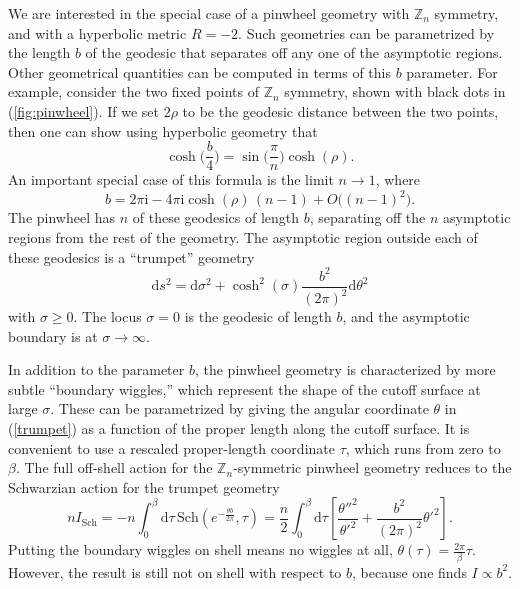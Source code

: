 \documentclass[12pt]{article}
\newcommand{\be}{\begin{equation}}
\newcommand{\ee}{\end{equation}}
\numberwithin{equation}{section}
\begin{document}

We are interested in the special case of a pinwheel geometry with $\mathbb{Z}_n$ symmetry, and with a hyperbolic metric $R = -2$. Such geometries can be parametrized by the length $b$ of the geodesic that separates off any one of the asymptotic regions. Other geometrical quantities can be computed in terms of this $b$ parameter. For example, consider the two fixed points of $\mathbb{Z}_n$ symmetry, shown with black dots in (\ref{fig:pinwheel}). If we set $2\rho$ to be the geodesic distance between the two points, then one can show using hyperbolic geometry that
\be
\cosh\Big(\frac{b}{4}\Big) = \sin\Big(\frac{\pi}{n}\Big)\cosh(\rho).
\ee
An important special case of this formula is the limit $n\rightarrow 1$, where
\be
b = 2\pi \mathrm{i} - 4\pi \mathrm{i} \cosh(\rho)\, (n{-}1) + O\big((n{-}1)^2\big).\label{nnearone}
\ee
The pinwheel has $n$ of these geodesics of length $b$, separating off the $n$ asymptotic regions from the rest of the geometry. The asymptotic region outside each of these geodesics is a ``trumpet'' geometry
\be
\mathrm{d}s^2 = \mathrm{d}\sigma^2 + \cosh^2(\sigma) \frac{b^2}{(2\pi)^2}\mathrm{d}\theta^2\label{trumpet}
\ee
with $\sigma \ge 0$. The locus $\sigma = 0$ is the geodesic of length $b$, and the asymptotic boundary is at $\sigma \rightarrow \infty$. 

In addition to the parameter $b$, the pinwheel geometry is characterized by more subtle ``boundary wiggles,'' which represent the shape of the cutoff surface at large $\sigma$. These can be parametrized by giving the angular coordinate $\theta$ in (\ref{trumpet}) as a function of the proper length along the cutoff surface. It is convenient to use a rescaled proper-length coordinate $\tau$, which runs from zero to $\beta$. The full off-shell action for the $\mathbb{Z}_n$-symmetric pinwheel geometry reduces \cite{Maldacena:2019cbz} to the Schwarzian action for the trumpet geometry \cite{Saad:2019lba}
\be
nI_{\text{Sch}} = -n\int_0^\beta\mathrm{d}\tau\, \text{Sch}(e^{-\frac{\theta b}{2\pi}},\tau) = \frac{n}{2}\int_0^\beta\mathrm{d}\tau\left[\frac{\theta''^2}{\theta'^2} + \frac{b^2}{(2\pi)^2}\theta'^2\right].
\ee
Putting the boundary wiggles on shell means no wiggles at all, $\theta(\tau) = \frac{2\pi}{\beta}\tau$. However, the result is still not on shell with respect to $b$, because one finds $I \propto b^2$.
\end{document}
